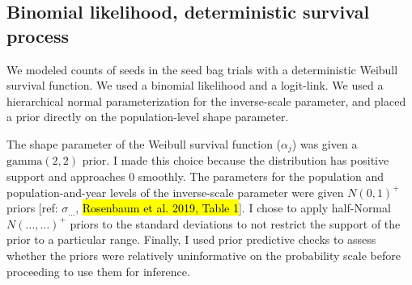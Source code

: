 \documentclass[12pt, oneside, titlepage]{article}   	%
\begin{document}



\subsection*{Binomial likelihood, deterministic survival process}

We modeled counts of seeds in the seed bag trials with a deterministic Weibull survival function. We used a binomial likelihood and a logit-link. We used a hierarchical normal parameterization for the inverse-scale parameter, and placed a prior directly on the population-level shape parameter. 

The shape parameter of the Weibull survival function ($\alpha_j$) was given a $\mathrm{gamma}(2,2)$ prior. I made this choice because the distribution has positive support and approaches 0 smoothly. The parameters for the population and population-and-year levels of the inverse-scale parameter were given $N(0,1)^+$ priors [ref: $\sigma_{\dots}$, \hl{Rosenbaum et al. 2019, Table 1}]. I chose to apply half-Normal $N(\dots,\dots)^+$ priors to the standard deviations to not restrict the support of the prior to a particular range. Finally, I used prior predictive checks to assess whether the priors were relatively uninformative on the probability scale before proceeding to use them for inference.
\end{document}
